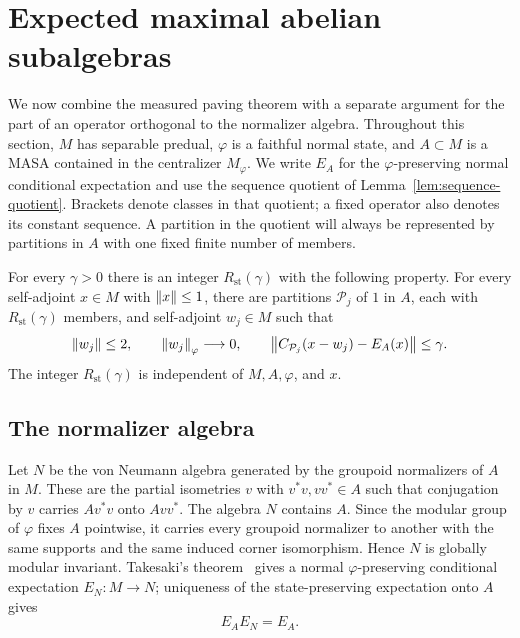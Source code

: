 \section{Expected maximal abelian subalgebras}
\label{sec:expected}

We now combine the measured paving theorem with a separate argument for the
part of an operator orthogonal to the normalizer algebra. Throughout this
section, $M$ has separable predual, $\varphi$ is a faithful normal state, and
$A\subset M$ is a MASA contained in the centralizer $M_\varphi$. We write
$E_A$ for the $\varphi$-preserving normal conditional expectation and use
the sequence quotient of Lemma~\ref{lem:sequence-quotient}. Brackets denote
classes in that quotient; a fixed operator also denotes its constant
sequence. A partition in the quotient will always be represented by
partitions in $A$ with one fixed finite number of members.

\begin{theorem}\label{thm:state-paving}
For every $\gamma>0$ there is an integer $R_{\mathrm{st}}(\gamma)$ with the following
property. For every self-adjoint $x\in M$ with $\left\lVert x\right\rVert\leq1$, there are
partitions $\mathcal P_j$ of $1$ in $A$, each with $R_{\mathrm{st}}(\gamma)$ members,
and self-adjoint $w_j\in M$ such that
\begin{equation}\label{exp:state-paving}
 \left\lVert w_j\right\rVert\leq2,\qquad
 \left\lVert w_j\right\rVert_\varphi\longrightarrow0,\qquad
 \left\lVert C_{\mathcal P_j}(x-w_j)-E_A(x)\right\rVert\leq\gamma.
\end{equation}
The integer $R_{\mathrm{st}}(\gamma)$ is independent of $M,A,\varphi$, and $x$.
\end{theorem}

\subsection{The normalizer algebra}

Let $N$ be the von Neumann algebra generated by the groupoid normalizers
of $A$ in $M$. These are the partial isometries $v$ with $v^*v,vv^*\in A$
such that conjugation by $v$ carries $A v^*v$ onto $A vv^*$. The algebra
$N$ contains $A$. Since the modular group of $\varphi$ fixes $A$
pointwise, it carries every groupoid normalizer to another with the same
supports and the same induced corner isomorphism. Hence $N$ is globally
modular invariant. Takesaki's theorem~\cite{Takesaki72} gives a normal
$\varphi$-preserving conditional expectation $E_N:M\to N$; uniqueness of
the state-preserving expectation onto $A$ gives
\begin{equation}\label{exp:expectation-composition}
 E_A E_N=E_A.
\end{equation}

